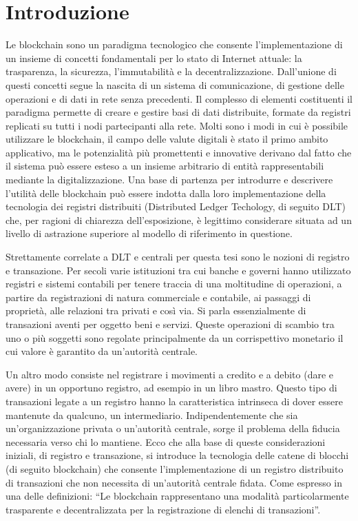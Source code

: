 \chapter{Introduzione}

Le blockchain sono un paradigma tecnologico che consente l’implementazione di un insieme di concetti fondamentali per lo stato di Internet attuale: la trasparenza, la sicurezza, l’immutabilità e la decentralizzazione. Dall’unione di questi concetti segue la nascita di un sistema di comunicazione, di gestione delle operazioni e di dati in rete senza precedenti. Il complesso di elementi costituenti il paradigma permette di creare e gestire basi di dati distribuite, formate da registri replicati su tutti i nodi partecipanti alla rete. Molti sono i modi in cui è possibile utilizzare le blockchain, il campo delle valute digitali è stato il primo ambito applicativo, ma le potenzialità più promettenti e innovative derivano dal fatto che il sistema può essere esteso a un insieme arbitrario di entità rappresentabili mediante la digitalizzazione. 
Una base di partenza per introdurre e descrivere l’utilità delle blockchain può essere indotta dalla loro implementazione della tecnologia dei registri distribuiti (Distributed Ledger Techology, di seguito DLT) che, per ragioni di chiarezza dell’esposizione, è legittimo considerare situata ad un livello di astrazione superiore al modello di riferimento in questione. 

Strettamente correlate a DLT e centrali per questa tesi sono le nozioni di registro e transazione. Per secoli varie istituzioni tra cui banche e governi hanno utilizzato registri e sistemi contabili per tenere traccia di una moltitudine di operazioni, a partire da registrazioni di natura commerciale e contabile, ai passaggi di proprietà, alle relazioni tra privati e così via. Si parla essenzialmente di transazioni aventi per oggetto beni e servizi. Queste operazioni di scambio tra uno o più soggetti sono regolate principalmente da un corrispettivo monetario il cui valore è garantito da un’autorità centrale.

Un altro modo consiste nel registrare i movimenti a credito e a debito (dare e avere) in un opportuno registro, ad esempio in un libro mastro. Questo tipo di transazioni legate a un registro hanno la caratteristica intrinseca di dover essere mantenute da qualcuno, un intermediario. Indipendentemente che sia un’organizzazione privata o un’autorità centrale, sorge il problema della fiducia necessaria verso chi lo mantiene. Ecco che alla base di queste considerazioni iniziali, di registro e transazione, si introduce la tecnologia delle catene di blocchi (di seguito blockchain) che consente l’implementazione di un registro distribuito di transazioni che non necessita di un'autorità centrale fidata. Come espresso in una delle definizioni: “Le blockchain rappresentano una modalità particolarmente trasparente e decentralizzata per la registrazione di elenchi di transazioni”.

